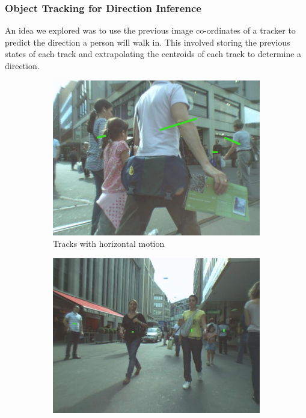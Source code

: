 \newpage
\subsubsection{Object Tracking for Direction Inference} \label{sec:objecTrackingDirection}
An idea we explored was to use the previous image co-ordinates of a tracker to predict the direction a person will walk in. This involved storing the previous states of each track and extrapolating the centroids of each track to determine a direction.

\begin{figure}[ht]
	\begin{subfigure}[b]{.45\textwidth}
		\centering
		\includegraphics[width=1.0\linewidth]{img/chapter4_analysis/linExDirection.png}
		\caption{Tracks with horizontal motion}
	\end{subfigure}%
	\hspace{\fill} 
	\begin{subfigure}[b]{.45\textwidth}
		\centering
		\includegraphics[width=1.0\linewidth]{img/chapter4_analysis/linExDirectionAmb.png}

\end{subfigure}
\end{figure}

